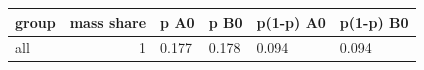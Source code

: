 \begingroup\small
\setlength{\tabcolsep}{3pt}
\renewcommand{\arraystretch}{1.04}
\begin{tabularx}{\linewidth}{XrXXXX}
\toprule
group & mass share & p A0 & p B0 & p(1-p) A0 & p(1-p) B0 \\
\midrule
all & 1 & 0.177 & 0.178 & 0.094 & 0.094 \\
\bottomrule
\end{tabularx}
\endgroup
